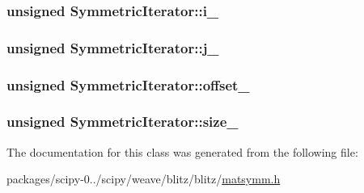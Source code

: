 \subsubsection[{i\+\_\+}]{\setlength{\rightskip}{0pt plus 5cm}unsigned Symmetric\+Iterator\+::i\+\_\+\hspace{0.3cm}{\ttfamily [protected]}}\label{classSymmetricIterator_ac592bd5ebb045c0ef23511d26f89fefe}
\hypertarget{classSymmetricIterator_a51d98d28b3de3b6719c74960a151d3a4}{}
\subsubsection[{j\+\_\+}]{\setlength{\rightskip}{0pt plus 5cm}unsigned Symmetric\+Iterator\+::j\+\_\+\hspace{0.3cm}{\ttfamily [protected]}}\label{classSymmetricIterator_a51d98d28b3de3b6719c74960a151d3a4}
\hypertarget{classSymmetricIterator_a5816a2db16fb9fb1067d83f5fa35baa4}{}
\subsubsection[{offset\+\_\+}]{\setlength{\rightskip}{0pt plus 5cm}unsigned Symmetric\+Iterator\+::offset\+\_\+\hspace{0.3cm}{\ttfamily [protected]}}\label{classSymmetricIterator_a5816a2db16fb9fb1067d83f5fa35baa4}
\hypertarget{classSymmetricIterator_af20fec83b924fece2f18e16e64d1d158}{}
\subsubsection[{size\+\_\+}]{\setlength{\rightskip}{0pt plus 5cm}unsigned Symmetric\+Iterator\+::size\+\_\+\hspace{0.3cm}{\ttfamily [protected]}}\label{classSymmetricIterator_af20fec83b924fece2f18e16e64d1d158}


The documentation for this class was generated from the following file\+:\begin{DoxyCompactItemize}
\item 
packages/scipy-\/0../scipy/weave/blitz/blitz/\hyperlink{matsymm_8h}{matsymm.\+h}\end{DoxyCompactItemize}
